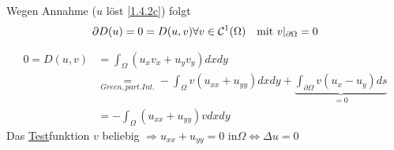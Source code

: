 \begin{beispiel}
    Wegen Annahme ($u$ löst \eqref{1.4.2c}) folgt 
    \[
        \partial D(u) = 0 = D(u,v)\\
        \forall v\in\mathcal{C}^1(\Omega) \quad \text{mit } v|_{\partial\Omega} = 0
    \]

    \[
        \begin{aligned}
            0 = D(u,v) & = \int_{\Omega} (u_x v_x + u_yv_y) dx dy\\
            & \underset{Green, part. Int.}{=} - \int_{\Omega} v(u_{xx} + u_{yy}) dx dy + \underbrace{\int_{\partial\Omega} v(u_x - u_y) ds}_{=0}\\
            & = - \int_{\Omega} (u_{xx}+u_{yy})v dx dy
        \end{aligned}
    \]
    Das \underline{Test}funktion $v$ beliebig
    $\Rightarrow u_{xx}+u_{yy} = 0 \text{ in} \Omega \Leftrightarrow \Delta u = 0$ 
\end{beispiel}
